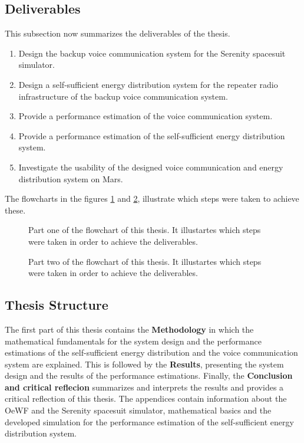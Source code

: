 \subsection{Deliverables}
This subsection now summarizes the deliverables of the thesis.
\begin{enumerate}
  \item Design the backup voice communication system for the Serenity spacesuit simulator.
  \item Design a self-sufficient energy distribution system for the repeater radio infrastructure of the backup voice communication system.
  \item Provide a performance estimation of the voice communication system.
  \item Provide a performance estimation of the self-sufficient energy distribution system.
  \item Investigate the usability of the designed voice communication and energy distribution system on Mars.
\end{enumerate} 
The flowcharts in the figures \ref{fig:tikz_flowchart_1} and \ref{fig:tikz_flowchart_2}, illustrate which steps were taken to achieve these.
\begin{figure}[h!]
	\centering
	
	\caption{Part one of the flowchart of this thesis. It illustartes which steps were taken in order to achieve the deliverables.}
	\label{fig:tikz_flowchart_1}
\end{figure}
\begin{figure}[h!]
	\centering
	
	\caption{Part two of the flowchart of this thesis. It illustartes which steps were taken in order to achieve the deliverables.}
	\label{fig:tikz_flowchart_2}
\end{figure}

\subsection{Thesis Structure}
The first part of this thesis contains the \textbf{Methodology} in which the mathematical fundamentals for the system design and the performance estimations of the self-sufficient energy distribution and the voice communication system are explained. This is followed by the \textbf{Results}, presenting the system design and the results of the performance estimations. Finally, the \textbf{Conclusion and critical reflecion} summarizes and interprets the results and provides a critical reflection of this thesis. The appendices contain information about the OeWF and the Serenity spacesuit simulator, mathematical basics and the developed \MATLAB simulation for the performance estimation of the self-sufficient energy distribution system.

